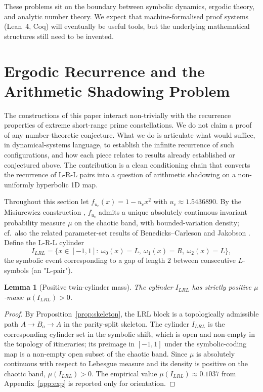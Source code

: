 \documentclass[11pt,a4paper]{article}
\newtheorem{lemma}{Lemma}
\theoremstyle{definition}
\begin{document}
These problems sit on the boundary between symbolic dynamics, ergodic
theory, and analytic number theory. We expect that machine-formalised
proof systems (Lean~4, Coq) will eventually be useful tools, but the
underlying mathematical structures still need to be invented.

\section{Ergodic Recurrence and the Arithmetic Shadowing Problem}
\label{sec:twin-pathway}

The constructions of this paper interact non-trivially with the
recurrence properties of extreme short-range prime constellations.
We do not claim a proof of any number-theoretic conjecture. What we
do is articulate what would suffice, in dynamical-systems language,
to establish the infinite recurrence of such configurations, and how
each piece relates to results already established or conjectured
above. The contribution is a clean conditioning chain that converts
the recurrence of L-R-L pairs into a question of arithmetic
shadowing on a non-uniformly hyperbolic 1D map.

Throughout this section let $f_{u_c}(x) = 1 - u_c x^2$ with
$u_c \approx 1.5436890$. By the Misiurewicz construction
\cite{misiurewicz1981absolutely}, $f_{u_c}$ admits a unique absolutely
continuous invariant probability measure $\mu$ on the chaotic band,
with bounded-variation density; cf.\ also the related parameter-set
results of Benedicks--Carleson \cite{benedicks1985dynamics} and
Jakobson \cite{jakobson1981absolutely}. Define the L-R-L cylinder
\[
    I_{LRL} = \{ x \in [-1, 1] :\
        \omega_0(x) = L,\ \omega_1(x) = R,\ \omega_2(x) = L \},
\]
the symbolic event corresponding to a gap of length $2$ between
consecutive $L$-symbols (an "L-pair").

\begin{lemma}[Positive twin-cylinder mass]
\label{lem:positive-mass}
The cylinder $I_{LRL}$ has strictly positive $\mu$-mass:
$\mu(I_{LRL}) > 0$.
\end{lemma}
\begin{proof}
By Proposition~\ref{prop:skeleton}, the LRL block is a topologically
admissible path $A \to B_o \to A$ in the parity-split skeleton. The
cylinder $I_{LRL}$ is the corresponding cylinder set in the symbolic
shift, which is open and non-empty in the topology of itineraries; its
preimage in $[-1, 1]$ under the symbolic-coding map is a non-empty
open subset of the chaotic band. Since $\mu$ is absolutely continuous
with respect to Lebesgue measure
\cite{misiurewicz1981absolutely,jakobson1981absolutely} and its density
is positive on the chaotic band, $\mu(I_{LRL}) > 0$. The empirical
value $\mu(I_{LRL}) \approx 0.1037$ from
Appendix~\ref{app:exp} is reported only for orientation.
\end{proof}
\end{document}
